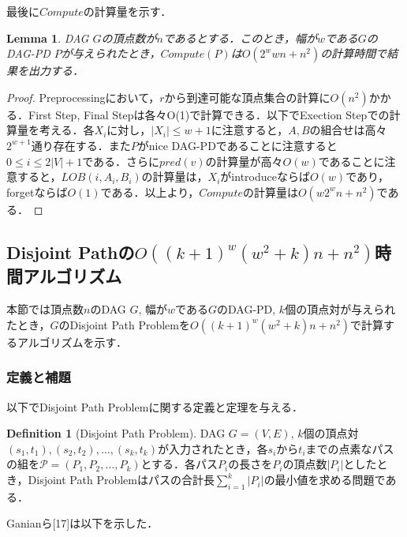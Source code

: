\documentclass[master]{kuisthesis}		%
\theoremstyle{plain}
\newtheorem{lemma}{Lemma}
\theoremstyle{definition}
\newtheorem{definition*}{Definition}
\begin{document}
最後に$Compute$の計算量を示す．

\begin{lemma}
    DAG $G$の頂点数が$n$であるとする．このとき，幅が$w$である$G$のDAG-PD $P$が与えられたとき，$Compute(P)$は$O(2^wwn + n^2)$の計算時間で結果を出力する．
\end{lemma}

\begin{proof}
    Preprocessingにおいて，$r$から到達可能な頂点集合の計算に$O(n^2)$かかる．First Step, Final Stepは各々O(1)で計算できる．以下でExection Stepでの計算量を考える．各$X_i$に対し，$|X_i| \leq w+1$に注意すると，$A, B$の組合せは高々$2^{w+1}$通り存在する．また$P$がnice DAG-PDであることに注意すると$0 \leq i \leq 2|V|+1$である．さらに$pred(v)$の計算量が高々$O(w)$であることに注意すると，$LOB(i, A_i, B_i)$の計算量は，$X_i$がintroduceならば$O(w)$であり，forgetならば$O(1)$である．以上より，$Compute$の計算量は$O(w2^wn+n^2)$である．
\end{proof}














\subsection{Disjoint Pathの$O((k+1)^w(w^2+k)n+n^2)$時間アルゴリズム}

本節では頂点数$n$のDAG $G$, 幅が$w$である$G$のDAG-PD, $k$個の頂点対が与えられたとき，$G$のDisjoint Path Problemを$O((k+1)^w(w^2+k)n+n^2)$で計算するアルゴリズムを示す．

\subsubsection{定義と補題}
以下でDisjoint Path Problemに関する定義と定理を与える．

\begin{definition*}[Disjoint Path Problem]
    DAG $G=(V, E)$, $k$個の頂点対$(s_1, t_1), (s_2, t_2), \dots , (s_k, t_k)$が入力されたとき，各$s_i$から$t_i$までの点素なパスの組を$\mathcal{P}=(P_1, P_2, \dots , P_k)$とする．各パス$P_i$の長さを$P_i$の頂点数$|P_i|$としたとき，Disjoint Path Problemはパスの合計長$\sum_{i=1}^k |P_i|$の最小値を求める問題である．
\end{definition*}

Ganianら[17]は以下を示した．
\end{document}
